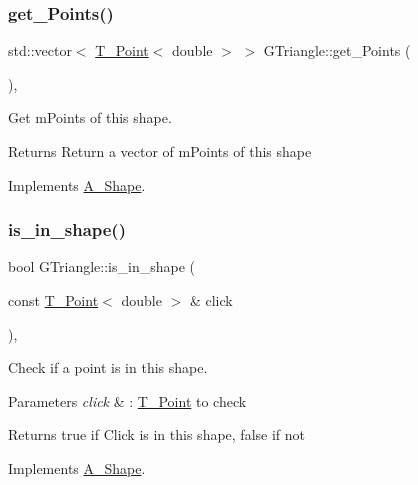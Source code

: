 \subsubsection{\texorpdfstring{get\+\_\+\+Points()}{get\_Points()}}
{\footnotesize\ttfamily std\+::vector$<$ \hyperlink{classPoint}{T_Point}$<$ double $>$ $>$ G\+Triangle\+::get\+\_\+\+Points (\begin{DoxyParamCaption}{ }\end{DoxyParamCaption})\hspace{0.3cm}{\ttfamily [override]}, {\ttfamily [virtual]}}



Get mPoints of this shape.

\begin{DoxyReturn}{Returns}
Return a vector of mPoints of this shape
\end{DoxyReturn}


Implements \hyperlink{classShape_add74a5c682840fa4a519242b1ddbd0b5}{A_Shape}.

\mbox{\label{classGTriangle_abb6f7243155483cc6de301931e87475a}} 
\subsubsection{\texorpdfstring{is\+\_\+in\+\_\+shape()}{is\_in\_shape()}}
{\footnotesize\ttfamily bool G\+Triangle\+::is\+\_\+in\+\_\+shape (\begin{DoxyParamCaption}\item[{const \hyperlink{classPoint}{T_Point}$<$ double $>$ \&}]{click }\end{DoxyParamCaption})\hspace{0.3cm}{\ttfamily [override]}, {\ttfamily [virtual]}}



Check if a point is in this shape. 


\begin{DoxyParams}{Parameters}
{\em click} & \+: \hyperlink{classPoint}{T_Point} to check \\
\hline
\end{DoxyParams}
\begin{DoxyReturn}{Returns}
true if Click is in this shape, false if not
\end{DoxyReturn}


Implements \hyperlink{classShape_aa09a621da090e42840b4bec7ffb27620}{A_Shape}.

